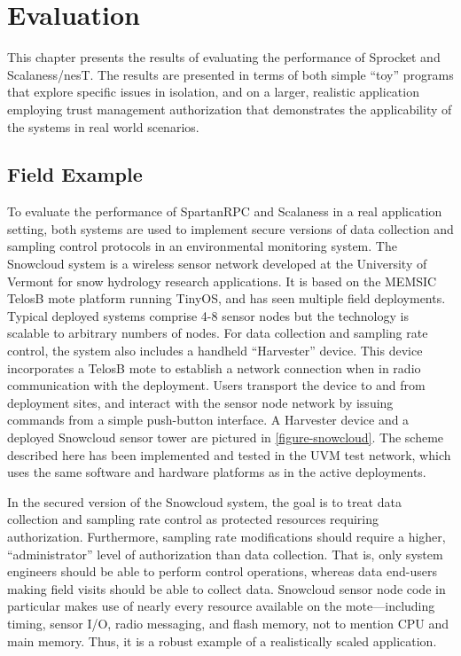 
\chapter{Evaluation}
\label{chapter-evaluation}

This chapter presents the results of evaluating the performance of Sprocket and Scalaness/nesT.
The results are presented in terms of both simple ``toy'' programs that explore specific issues
in isolation, and on a larger, realistic application employing trust management authorization
that demonstrates the applicability of the systems in real world scenarios.

\section{Field Example}
\label{section-field-example}

To evaluate the performance of SpartanRPC and Scalaness in a real application setting, both
systems are used to implement secure versions of data collection and sampling control protocols
in an environmental monitoring system. The Snowcloud system
\cite{frolik-skalka-snowcloudtr,moeser-walker-skalka-frolik-wsc11} is a wireless sensor network
developed at the University of Vermont for snow hydrology research applications. It is based on
the MEMSIC TelosB mote platform running TinyOS, and has seen multiple field deployments. Typical
deployed systems comprise 4-8 sensor nodes but the technology is scalable to arbitrary numbers
of nodes. For data collection and sampling rate control, the system also includes a handheld
``Harvester'' device. This device incorporates a TelosB mote to establish a network connection
when in radio communication with the deployment. Users transport the device to and from
deployment sites, and interact with the sensor node network by issuing commands from a simple
push-button interface. A Harvester device and a deployed Snowcloud sensor tower are pictured in
\autoref{figure-snowcloud}. The scheme described here has been implemented and tested in the UVM
test network, which uses the same software and hardware platforms as in the active deployments.

\snowcloudfig

In the secured version of the Snowcloud system, the goal is to treat data collection and
sampling rate control as protected resources requiring authorization. Furthermore, sampling rate
modifications should require a higher, ``administrator'' level of authorization than data
collection. That is, only system engineers should be able to perform control operations, whereas
data end-users making field visits should be able to collect data. Snowcloud sensor node code in
particular makes use of nearly every resource available on the mote---including timing, sensor
I/O, radio messaging, and flash memory, not to mention CPU and main memory. Thus, it is a robust
example of a realistically scaled application.

